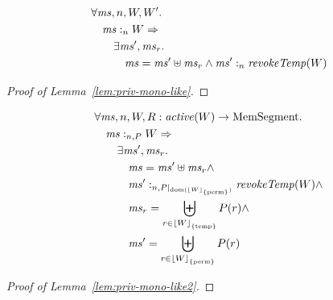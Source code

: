 \documentclass[a4paper]{article}
\DeclarePairedDelimiter\floor{\lfloor}{\rfloor}
\newcommand{\fun}{\rightarrow}
\DeclareMathOperator{\dom}{dom}
\newcommand\lau[1]{{\color{purple} \sf \footnotesize {LS: #1}}\\}
\newcommand\dominique[1]{{\color{purple} \sf \footnotesize {DD: #1}}\\}
\newcommand{\var}[1]{\mathit{#1}}
\newcommand{\hs}{\var{ms}}
\newcommand{\ms}{\hs}
\newcommand{\heap}{\var{mem}}
\newcommand{\plainfun}[2]{
  \ifthenelse{\equal{#2}{}}
  {\mathit{#1}}
  {\mathit{#1}(#2)}
}
\newcommand{\erase}[2]{\floor*{#1}_{\{#2\}}}
\newcommand{\activeReg}[1]{\plainfun{active}{#1}}
\newcommand{\futurewk}{\mathbin{\sqsupseteq}^{\var{pub}}}
\newcommand{\heapSat}[3][\heap]{#1 :_{#2} #3}
\newcommand{\memSatPar}[4][n]{\heapSat[#2]{#1 , #4}{#3}}
\newcommand{\plaindom}[1]{\mathrm{#1}}
\newcommand{\HeapSegments}{\plaindom{MemSegment}}
\newcommand{\MemSegments}{\HeapSegments}
\newcommand{\plainview}[1]{\mathrm{#1}}
\newcommand{\perma}{\plainview{perm}}
\newcommand{\temp}{\plainview{temp}}
\begin{document}


\begin{lemma}
  \label{lem:priv-mono-like}
  \begin{align*}
    &      \forall \hs, n, W, W' \ldotp \\
    & \quad  \heapSat[\hs]{n}{W} \Rightarrow\\
    & \qquad \exists \hs', \hs_r \ldotp \\
    & \qquad \quad \hs = \hs' \uplus \hs_r \land \heapSat[\hs']{n}{\wrev{W}}
  \end{align*}
\end{lemma}
\begin{proof}[Proof of Lemma~\ref{lem:priv-mono-like}]
\end{proof}

\begin{lemma}
  \label{lem:priv-mono-like2}
  \begin{align*}
    & \forall \ms, n, W, R : \activeReg{W} \fun \MemSegments  \ldotp \\
    & \quad \memSatPar{\ms}{W}{P} \Rightarrow \\
    & \qquad \exists \ms', \ms_r\ldotp \\
    & \qquad \quad \ms = \ms' \uplus \ms_r \land \\
    & \qquad \quad \memSatPar{\ms'}{\wrev{W}}{P|_{\dom(\erase{W}{\perma})}} \land \\
    & \qquad \quad \ms_r = \biguplus_{r \in \erase{W}{\temp}} P(r) \land \\
    & \qquad \quad \ms' = \biguplus_{r \in \erase{W}{\perma}} P(r)
  \end{align*}
\end{lemma}
\begin{proof}[Proof of Lemma~\ref{lem:priv-mono-like2}]
\end{proof}
\end{document}
